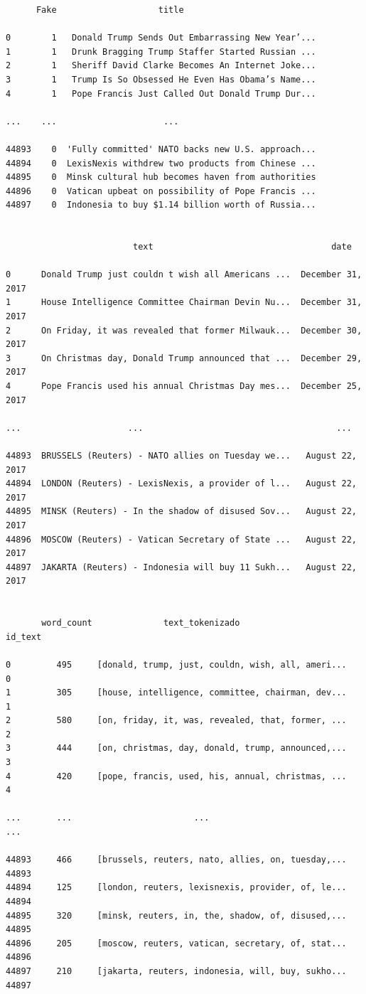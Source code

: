 \documentclass[
  11pt,
  a4paper,
]{article}
\begin{document}
\begin{verbatim}
      Fake                    title                                            
      
0        1   Donald Trump Sends Out Embarrassing New Year’...   
1        1   Drunk Bragging Trump Staffer Started Russian ...   
2        1   Sheriff David Clarke Becomes An Internet Joke...   
3        1   Trump Is So Obsessed He Even Has Obama’s Name...   
4        1   Pope Francis Just Called Out Donald Trump Dur...   

...    ...                     ...   

44893    0  'Fully committed' NATO backs new U.S. approach...   
44894    0  LexisNexis withdrew two products from Chinese ...   
44895    0  Minsk cultural hub becomes haven from authorities   
44896    0  Vatican upbeat on possibility of Pope Francis ...   
44897    0  Indonesia to buy $1.14 billion worth of Russia...   


                         text                                   date                

0      Donald Trump just couldn t wish all Americans ...  December 31, 2017   
1      House Intelligence Committee Chairman Devin Nu...  December 31, 2017   
2      On Friday, it was revealed that former Milwauk...  December 30, 2017   
3      On Christmas day, Donald Trump announced that ...  December 29, 2017   
4      Pope Francis used his annual Christmas Day mes...  December 25, 2017 

...                     ...                                      ...   

44893  BRUSSELS (Reuters) - NATO allies on Tuesday we...   August 22, 2017    
44894  LONDON (Reuters) - LexisNexis, a provider of l...   August 22, 2017    
44895  MINSK (Reuters) - In the shadow of disused Sov...   August 22, 2017    
44896  MOSCOW (Reuters) - Vatican Secretary of State ...   August 22, 2017    
44897  JAKARTA (Reuters) - Indonesia will buy 11 Sukh...   August 22, 2017   


       word_count              text_tokenizado                        id_text  

0         495     [donald, trump, just, couldn, wish, all, ameri...      0  
1         305     [house, intelligence, committee, chairman, dev...      1  
2         580     [on, friday, it, was, revealed, that, former, ...      2  
3         444     [on, christmas, day, donald, trump, announced,...      3  
4         420     [pope, francis, used, his, annual, christmas, ...      4  

...       ...                        ...                                ...  

44893     466     [brussels, reuters, nato, allies, on, tuesday,...    44893  
44894     125     [london, reuters, lexisnexis, provider, of, le...    44894  
44895     320     [minsk, reuters, in, the, shadow, of, disused,...    44895  
44896     205     [moscow, reuters, vatican, secretary, of, stat...    44896  
44897     210     [jakarta, reuters, indonesia, will, buy, sukho...    44897  
\end{verbatim}
\end{document}
